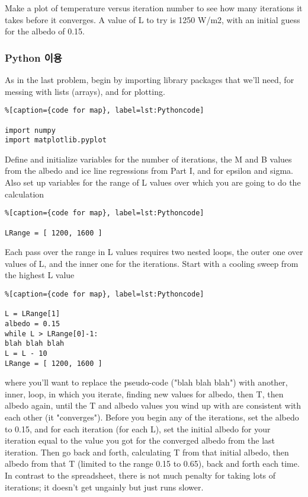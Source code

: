 {Make a plot of temperature versus iteration number to see how many iterations it takes before it converges. A value of L to try is 1250 W/m2, with an initial guess for the albedo of 0.15.

\subsubsection{Python 이용}\index{}

As in the last problem, begin by importing library packages that we'll need, for messing with lists (arrays), and for plotting.

\begin{lstlisting}%[caption={code for map}, label=lst:Pythoncode]

import numpy
import matplotlib.pyplot
\end{lstlisting}

Define and initialize variables for the number of iterations, the M and B values from the albedo and ice line regressions from Part I, and for epsilon and sigma. Also set up variables for the range of L values over which you are going to do the calculation

\begin{lstlisting}%[caption={code for map}, label=lst:Pythoncode]

LRange = [ 1200, 1600 ]
\end{lstlisting}
Each pass over the range in L values requires two nested loops, the outer one over values of L, and the inner one for the iterations. Start with a cooling sweep from the highest L value

\begin{lstlisting}%[caption={code for map}, label=lst:Pythoncode]

L = LRange[1]
albedo = 0.15
while L > LRange[0]-1:
blah blah blah
L = L - 10
LRange = [ 1200, 1600 ]
\end{lstlisting}

where you'll want to replace the pseudo-code ("blah blah blah") with another, inner, loop, in which you iterate, finding new values for albedo, then T, then albedo again, until the T and albedo values you wind up with are consistent with each other (it "converges"). Before you begin any of the iterations, set the albedo to 0.15, and for each iteration (for each L), set the initial albedo for your iteration equal to the value you got for the converged albedo from the last iteration. Then go back and forth, calculating T from that initial albedo, then albedo from that T (limited to the range 0.15 to 0.65), back and forth each time. In contrast to the spreadsheet, there is not much penalty for taking lots of iterations; it doesn’t get ungainly but just runs slower.

}
